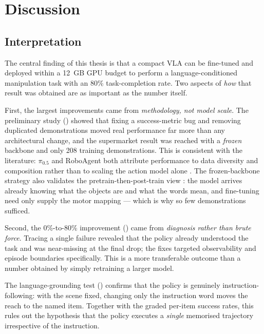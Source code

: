 \chapter{Discussion}
\label{chap:discussion}

\section{Interpretation}
\label{sec:disc-interp}
The central finding of this thesis is that a compact VLA can be fine-tuned and
deployed within a 12~GB GPU budget to perform a language-conditioned manipulation
task with an 80\% task-completion rate. Two aspects of \emph{how} that result was
obtained are as important as the number itself.

First, the largest improvements came from \emph{methodology, not model scale}. The
preliminary study () showed that fixing a success-metric
bug and removing duplicated demonstrations moved real performance far more than any
architectural change, and the supermarket result was reached with a
\emph{frozen} backbone and only 208 training demonstrations. This is consistent with the
literature: $\pi_{0.5}$ and RoboAgent both attribute performance to data diversity
and composition rather than to scaling the action model alone
\parencite{black2025pi05, bharadhwaj2024roboagent}. The frozen-backbone strategy
also validates the pretrain-then-post-train view \parencite{xiang2026posttraining}:
the model arrives already knowing what the objects are and what the words mean, and
fine-tuning need only supply the motor mapping --- which is why so few
demonstrations sufficed.

Second, the 0\%-to-80\% improvement () came from
\emph{diagnosis rather than brute force}. Tracing a single failure revealed that
the policy already understood the task and was near-missing at the final drop; the
fixes targeted observability and episode boundaries specifically. This is a more
transferable outcome than a number obtained by simply retraining a larger model.

The language-grounding test () confirms that the
policy is genuinely instruction-following: with the scene fixed, changing only the
instruction word moves the reach to the named item. Together with the graded
per-item success rates, this rules out the hypothesis that the policy executes a
\emph{single} memorised trajectory irrespective of the instruction.


